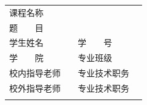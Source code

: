 \documentclass[a4paper, 11pt]{ctexart}
\begin{document}
\begin{titlepage}

    \begin{center}
    \end{center}

    \begin{table}[!b]
        \fontsize{14pt}{0}\selectfont
        \begin{tabularx}{\textwidth}{lXlX}
            \rule{0pt}{36pt}
            课程名称     & \multicolumn{3}{l}{}                        \\
            \cline{2-4}
            \rule{0pt}{36pt}
            题　　目     & \multicolumn{3}{l}{}                        \\
            \cline{2-4}
            \rule{0pt}{36pt}
            学生姓名     &                      & \quad 学　　号     & \\
            \cline{2-2} \cline{4-4}
            \rule{0pt}{36pt}
            学　　院     &                      & \quad 专业班级     & \\
            \cline{2-2} \cline{4-4}
            \rule{0pt}{36pt}
            校内指导老师 &                      & \quad 专业技术职务 & \\
            \cline{2-2} \cline{4-4}
            \rule{0pt}{36pt}
            校外指导老师 &                      & \quad 专业技术职务 & \\
            \cline{2-2} \cline{4-4}
            \rule{0pt}{36pt}
        \end{tabularx}
    \end{table}

\end{titlepage}
\end{document}
